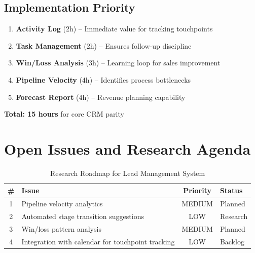 \subsection{Implementation Priority}

\begin{tcolorbox}[colback=green!5!white, colframe=green!50!black,
    title=Recommended Implementation Order]
\begin{enumerate}
    \item \textbf{Activity Log} (2h) -- Immediate value for tracking touchpoints
    \item \textbf{Task Management} (2h) -- Ensures follow-up discipline
    \item \textbf{Win/Loss Analysis} (3h) -- Learning loop for sales improvement
    \item \textbf{Pipeline Velocity} (4h) -- Identifies process bottlenecks
    \item \textbf{Forecast Report} (4h) -- Revenue planning capability
\end{enumerate}

\textbf{Total: 15 hours} for core CRM parity
\end{tcolorbox}


\section{Open Issues and Research Agenda}
\label{sec:bn-open}

\begin{table}[htbp]
\centering
\caption{Research Roadmap for Lead Management System}
\label{tab:bn-roadmap}
\renewcommand{\arraystretch}{1.3}
\begin{tabular}{@{}clcl@{}}
\toprule
\textbf{\#} & \textbf{Issue} & \textbf{Priority} & \textbf{Status} \\
\midrule
1 & Pipeline velocity analytics & MEDIUM & Planned \\
2 & Automated stage transition suggestions & LOW & Research \\
3 & Win/loss pattern analysis & MEDIUM & Planned \\
4 & Integration with calendar for touchpoint tracking & LOW & Backlog \\
\bottomrule
\end{tabular}
\end{table}


